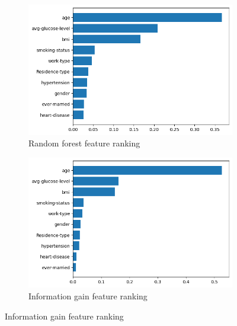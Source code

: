 \documentclass{Configuration_Files/Template}
\begin{document}
\begin{figure}[ht]
\centering
    \begin{subfigure}[b]{\linewidth}
    \includegraphics[scale=0.4]{Images/feature_ranking_random_forest.png}
    \caption{Random forest feature ranking}
    \label{fig:feature_ranking_forest}
    \end{subfigure}
    
    \begin{subfigure}[b]{\linewidth}
    \includegraphics[scale=0.4]{Images/feature_ranking_info_gain.png}
    \caption{Information gain feature ranking}
    \label{fig:feature_ranking_information}
    \end{subfigure}
    

\end{figure}
\end{document}
